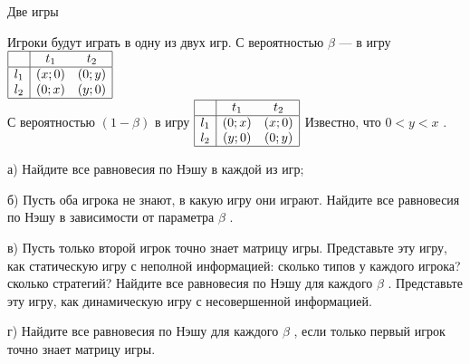 \begin{problem}
 Две игры\cite{polisci:lectures}\par
Игроки будут играть в одну из двух игр.
С вероятностью  $\beta $  — в игру  $\begin{array}{|c|cc|}  \hline {} & {t_{1} } & {t_{2} } \\  \hline {l_{1} } & {\left(x;0\right)} & {\left(0;y\right)} \\ {l_{2} } & {\left(0;x\right)} & {\left(y;0\right)} \\  \hline  \end{array}$  \\
С вероятностью  $\left(1-\beta \right)$  в игру  $\begin{array}{|c|cc|}  \hline {} & {t_{1} } & {t_{2} } \\  \hline {l_{1} } & {\left(0;x\right)} & {\left(x;0\right)} \\ {l_{2} } & {\left(y;0\right)} & {\left(0;y\right)} \\  \hline  \end{array}$
Известно, что  $0<y<x$ .\par
а)	Найдите все равновесия по Нэшу в каждой из игр;\par
б)	Пусть оба игрока не знают, в какую игру они играют. Найдите все равновесия по Нэшу в зависимости от параметра  $\beta $ .\par
в)	Пусть только второй игрок точно знает матрицу игры. Представьте эту игру, как статическую игру с неполной информацией: сколько типов у каждого игрока? сколько стратегий? Найдите все равновесия по Нэшу для каждого  $\beta $ . Представьте эту игру, как динамическую игру с несовершенной информацией.\par
г)	Найдите все равновесия по Нэшу для каждого  $\beta $ , если только первый игрок точно знает матрицу игры.\par



\begin{sol}

\end{sol}
\end{problem}



